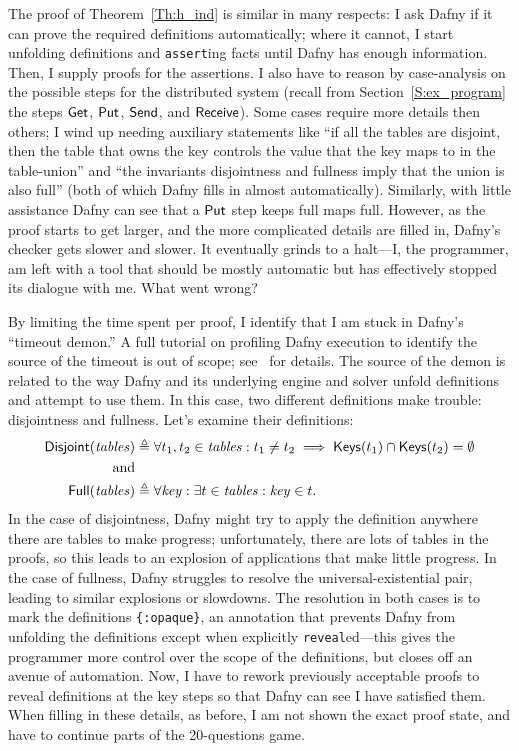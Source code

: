 The proof of Theorem~\ref{Th:h_ind} is similar in many respects: I ask Dafny if
it can prove the required definitions automatically; where it cannot, I start
unfolding definitions and \texttt{assert}ing facts until Dafny has enough
information. Then, I supply proofs for the assertions. I also have to reason by
case-analysis on the possible steps for the distributed system (recall from
Section~\ref{S:ex_program} the steps \(\mathsf{Get}\), \(\mathsf{Put}\),
\(\mathsf{Send}\), and \(\mathsf{Receive}\)). Some cases require more details then
others; I wind up needing auxiliary statements like ``if all the tables are
disjoint, then the table that owns the key controls the value that the key maps
to in the table-union'' and ``the invariants disjointness and fullness imply
that the union is also full'' (both of which Dafny fills in almost
automatically). Similarly, with little assistance Dafny can see that a
\(\mathsf{Put}\) step keeps full maps full. However, as the proof starts to get
larger, and the more complicated details are filled in, Dafny's checker gets
slower and slower. It eventually grinds to a halt---I, the programmer,
am left with a tool that should be mostly automatic but has effectively stopped
its dialogue with me. What went wrong?

By limiting the time spent per proof, I identify that I am stuck in Dafny's
``timeout demon.'' A full tutorial on profiling Dafny execution to identify the
source of the timeout is out of scope; see~\cite{Kapritsos_2020} for details.
The source of the demon is related to the way Dafny and its underlying engine
and solver unfold definitions and attempt to use them. In this case, two
different definitions make trouble: disjointness and fullness. Let's examine
their definitions:
\begin{align*}
    \mathsf{Disjoint}(\mathit{tables}) &\triangleq \forall t_1, t_2 \in \mathit{tables}:
    t_1 \neq t_2 \implies \mathsf{Keys}(t_1) \cap \mathsf{Keys}(t_2) = \emptyset
    \\ \text{and} \\
    \mathsf{Full}(\mathit{tables}) &\triangleq \forall \mathit{key} : \exists t \in
    \mathit{tables} : \mathit{key} \in t.
\end{align*}
In the case of disjointness, Dafny might try to apply the definition anywhere
there are tables to make progress; unfortunately, there are lots of tables in
the proofs, so this leads to an explosion of applications that make little
progress. In the case of fullness, Dafny struggles to resolve the
universal-existential pair, leading to similar explosions or slowdowns. The
resolution in both cases is to mark the definitions \texttt{\{:opaque\}}, an
annotation that prevents Dafny from unfolding the definitions except when
explicitly \texttt{reveal}ed---this gives the programmer more control over the
scope of the definitions, but closes off an avenue of automation. Now, I have to
rework previously acceptable proofs to reveal definitions at the key steps so
that Dafny can see I have satisfied them. When filling in these details, as
before, I am not shown the exact proof state, and have to continue parts of the
20-questions game.

